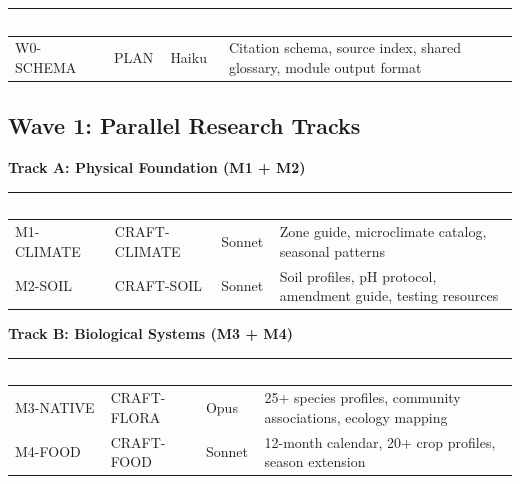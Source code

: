 \documentclass[11pt,letterpaper]{article}
\newcommand{\tableheader}[1]{\textbf{\sffamily\textcolor{white}{#1}}}
\begin{document}
\begin{center}
\begin{tabularx}{\textwidth}{L{2.5cm}L{2cm}C{1.5cm}X}
\toprule
{}
\tableheader{Component} & \tableheader{Agent} & \tableheader{Model} & \tableheader{Output} \\
\midrule
W0-SCHEMA & PLAN & Haiku & Citation schema, source index, shared glossary, module output format \\
\bottomrule
\end{tabularx}
\end{center}

\subsection{Wave 1: Parallel Research Tracks}

\textbf{Track A: Physical Foundation (M1 + M2)}

\begin{center}
\begin{tabularx}{\textwidth}{L{2.5cm}L{2.5cm}C{1.3cm}X}
\toprule
{}
\tableheader{Component} & \tableheader{Agent} & \tableheader{Model} & \tableheader{Output} \\
\midrule
M1-CLIMATE & CRAFT-CLIMATE & Sonnet & Zone guide, microclimate catalog, seasonal patterns \\
M2-SOIL & CRAFT-SOIL & Sonnet & Soil profiles, pH protocol, amendment guide, testing resources \\
\bottomrule
\end{tabularx}
\end{center}

\textbf{Track B: Biological Systems (M3 + M4)}

\begin{center}
\begin{tabularx}{\textwidth}{L{2.5cm}L{2.5cm}C{1.3cm}X}
\toprule
{}
\tableheader{Component} & \tableheader{Agent} & \tableheader{Model} & \tableheader{Output} \\
\midrule
M3-NATIVE & CRAFT-FLORA & Opus & 25+ species profiles, community associations, ecology mapping \\
M4-FOOD & CRAFT-FOOD & Sonnet & 12-month calendar, 20+ crop profiles, season extension \\
\bottomrule
\end{tabularx}
\end{center}
\end{document}

